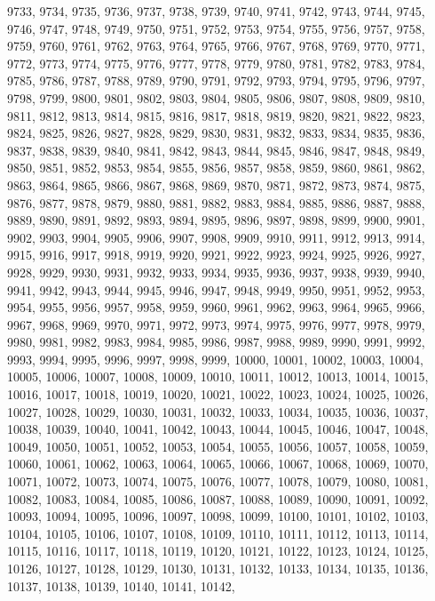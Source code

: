 9733,
9734,
9735,
9736,
9737,
9738,
9739,
9740,
9741,
9742,
9743,
9744,
9745,
9746,
9747,
9748,
9749,
9750,
9751,
9752,
9753,
9754,
9755,
9756,
9757,
9758,
9759,
9760,
9761,
9762,
9763,
9764,
9765,
9766,
9767,
9768,
9769,
9770,
9771,
9772,
9773,
9774,
9775,
9776,
9777,
9778,
9779,
9780,
9781,
9782,
9783,
9784,
9785,
9786,
9787,
9788,
9789,
9790,
9791,
9792,
9793,
9794,
9795,
9796,
9797,
9798,
9799,
9800,
9801,
9802,
9803,
9804,
9805,
9806,
9807,
9808,
9809,
9810,
9811,
9812,
9813,
9814,
9815,
9816,
9817,
9818,
9819,
9820,
9821,
9822,
9823,
9824,
9825,
9826,
9827,
9828,
9829,
9830,
9831,
9832,
9833,
9834,
9835,
9836,
9837,
9838,
9839,
9840,
9841,
9842,
9843,
9844,
9845,
9846,
9847,
9848,
9849,
9850,
9851,
9852,
9853,
9854,
9855,
9856,
9857,
9858,
9859,
9860,
9861,
9862,
9863,
9864,
9865,
9866,
9867,
9868,
9869,
9870,
9871,
9872,
9873,
9874,
9875,
9876,
9877,
9878,
9879,
9880,
9881,
9882,
9883,
9884,
9885,
9886,
9887,
9888,
9889,
9890,
9891,
9892,
9893,
9894,
9895,
9896,
9897,
9898,
9899,
9900,
9901,
9902,
9903,
9904,
9905,
9906,
9907,
9908,
9909,
9910,
9911,
9912,
9913,
9914,
9915,
9916,
9917,
9918,
9919,
9920,
9921,
9922,
9923,
9924,
9925,
9926,
9927,
9928,
9929,
9930,
9931,
9932,
9933,
9934,
9935,
9936,
9937,
9938,
9939,
9940,
9941,
9942,
9943,
9944,
9945,
9946,
9947,
9948,
9949,
9950,
9951,
9952,
9953,
9954,
9955,
9956,
9957,
9958,
9959,
9960,
9961,
9962,
9963,
9964,
9965,
9966,
9967,
9968,
9969,
9970,
9971,
9972,
9973,
9974,
9975,
9976,
9977,
9978,
9979,
9980,
9981,
9982,
9983,
9984,
9985,
9986,
9987,
9988,
9989,
9990,
9991,
9992,
9993,
9994,
9995,
9996,
9997,
9998,
9999,
10000,
10001,
10002,
10003,
10004,
10005,
10006,
10007,
10008,
10009,
10010,
10011,
10012,
10013,
10014,
10015,
10016,
10017,
10018,
10019,
10020,
10021,
10022,
10023,
10024,
10025,
10026,
10027,
10028,
10029,
10030,
10031,
10032,
10033,
10034,
10035,
10036,
10037,
10038,
10039,
10040,
10041,
10042,
10043,
10044,
10045,
10046,
10047,
10048,
10049,
10050,
10051,
10052,
10053,
10054,
10055,
10056,
10057,
10058,
10059,
10060,
10061,
10062,
10063,
10064,
10065,
10066,
10067,
10068,
10069,
10070,
10071,
10072,
10073,
10074,
10075,
10076,
10077,
10078,
10079,
10080,
10081,
10082,
10083,
10084,
10085,
10086,
10087,
10088,
10089,
10090,
10091,
10092,
10093,
10094,
10095,
10096,
10097,
10098,
10099,
10100,
10101,
10102,
10103,
10104,
10105,
10106,
10107,
10108,
10109,
10110,
10111,
10112,
10113,
10114,
10115,
10116,
10117,
10118,
10119,
10120,
10121,
10122,
10123,
10124,
10125,
10126,
10127,
10128,
10129,
10130,
10131,
10132,
10133,
10134,
10135,
10136,
10137,
10138,
10139,
10140,
10141,
10142,
